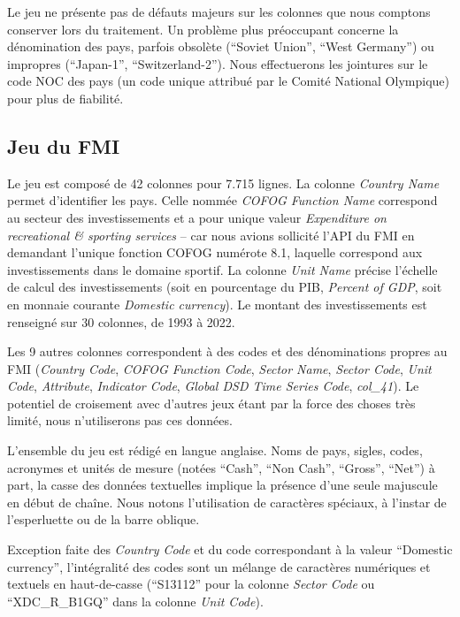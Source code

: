 \documentclass[hidelinks, 12pt]{report}
\begin{document}
Le jeu ne présente pas de défauts majeurs sur les colonnes que nous comptons conserver lors du traitement. Un problème plus préoccupant concerne la dénomination des pays, parfois obsolète (\enquote{Soviet Union}, \enquote{West Germany}) ou impropres (\enquote{Japan-1}, \enquote{Switzerland-2}). Nous effectuerons les jointures sur le code NOC des pays (un code unique attribué par le Comité National Olympique) pour plus de fiabilité.





%





\subsection{Jeu du FMI}

Le jeu est composé de 42 colonnes pour 7.715 lignes. La colonne \textit{Country Name} permet d'identifier les pays. Celle nommée \textit{COFOG Function Name} correspond au secteur des investissements et a pour unique valeur \textit{Expenditure on recreational \& sporting services} -- car nous avions sollicité l'API du FMI en demandant l'unique fonction COFOG numérote 8.1, laquelle correspond aux investissements dans le domaine sportif. La colonne \textit{Unit Name} précise l'échelle de calcul des investissements (soit en pourcentage du PIB, \textit{Percent of GDP}, soit en monnaie courante \textit{Domestic currency}). Le montant des investissements est renseigné sur 30 colonnes, de 1993 à 2022.

Les 9 autres colonnes correspondent à des codes et des dénominations propres au FMI (\textit{Country Code}, \textit{COFOG Function Code}, \textit{Sector Name}, \textit{Sector Code}, \textit{Unit Code}, \textit{Attribute}, \textit{Indicator Code}, \textit{Global DSD Time Series Code}, \textit{col\_41}). Le potentiel de croisement avec d'autres jeux étant par la force des choses très limité, nous n'utiliserons pas ces données.

L'ensemble du jeu est rédigé en langue anglaise. Noms de pays, sigles, codes, acronymes et unités de mesure (notées \enquote{Cash}, \enquote{Non Cash}, \enquote{Gross}, \enquote{Net}) à part, la casse des données textuelles implique la présence d'une seule majuscule en début de chaîne. Nous notons l'utilisation de caractères spéciaux, à l'instar de l'esperluette ou de la barre oblique.

Exception faite des \textit{Country Code} et du code correspondant à la valeur \enquote{Domestic currency}, l'intégralité des codes sont un mélange de caractères numériques et textuels en haut-de-casse (\enquote{S13112} pour la colonne \textit{Sector Code} ou \enquote{XDC\_R\_B1GQ} dans la colonne \textit{Unit Code}).
\end{document}
